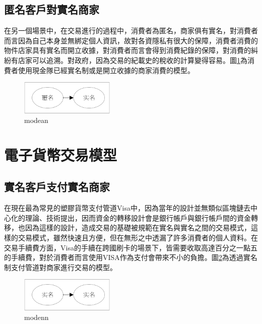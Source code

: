 
		\subsection{匿名客戶對實名商家}
		在另一個場景中，在交易進行的過程中，消費者為匿名，商家俱有實名，對消費者而言因為自己本身並無綁定個人資訊，故對各資隱私有很大的保障，消費者消費的物件店家具有實名而開立收據，對消費者而言會得到消費紀錄的保障，對消費的糾紛有店家可以追溯。對政府，因為交易的紀載史的稅收的計算變得容易。圖\ref{modean}為消費者使用現金隊已經實名制或是開立收據的商家消費的模型。

		\begin{figure}[h]
			\centering
			\includegraphics[width = 0.4\textwidth]{modean.png}
			\caption{modean}\label{modean}
		\end{figure}


	\section{電子貨幣交易模型}
		\subsection{實名客戶支付實名商家}
		在現在最為常見的塑膠貨幣支付管道Visa中，因為當年的設計並無類似區塊鏈去中心化的理論、技術提出，因而資金的轉移設計會是銀行帳戶與銀行帳戶間的資金轉移，也因為這樣的設計，造成交易的基礎被規範在實名與實名之間的交易模式，這樣的交易模式，雖然快速且方便，但在無形之中透漏了許多消費者的個人資料。在交易手續費方面，Visa的手續在跨國刷卡的場景下，皆需要收取高達百分之一點五的手續費，對於消費者而言使用VISA作為支付會帶來不小的負擔。圖\ref{modenn}為透過實名制支付管道對商家進行交易的模型。

		\begin{figure}[h]
			\centering
			\includegraphics[width = 0.4\textwidth]{modenn.png}
			\caption{modenn}\label{modenn}
		\end{figure}

